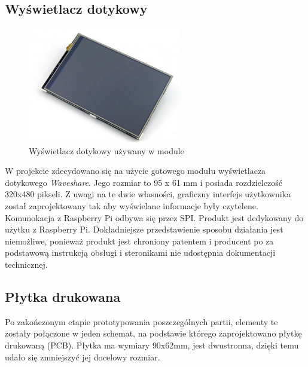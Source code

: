 \documentclass[12pt, eng, twoside, openany, final]{mgr}
\begin{document}
        \subsection{Wyświetlacz dotykowy}
            \begin{figure}[H]
            \begin{center}
                \includegraphics[width=0.6\textwidth]{wyswietlacz.jpg}
                \caption{Wyświetlacz dotykowy używany w module} 
            \end{center}
            \end{figure}
            W projekcie zdecydowano się na użycie gotowego modułu wyświetlacza dotykowego 
            \emph{Waveshare}. Jego rozmiar to 95 x 61 mm i posiada rozdzielczość 320x480 pikseli. Z uwagi na te dwie własności, graficzny interfejs użytkownika został zaprojektowany tak aby wyświelane informacje były czytelene. Komunokacja z Raspberry Pi odbywa się przez SPI. Produkt jest dedykowany do użytku z Raspberry Pi. Dokładniejsze przedstawienie sposobu działania jest niemożliwe, ponieważ produkt jest chroniony patentem i producent po za podstawową instrukcją obsługi i steronikami nie udostępnia dokumentacji technicznej.

        
        \subsection{Płytka drukowana}
            Po zakończonym etapie prototypowania poszczególnych partii, elementy te zostały połączone w jeden schemat, na podstawie którego zaprojektowano płytkę drukowaną (PCB). 
            Płytka ma wymiary 90x62mm, jest dwustronna, dzięki temu udało się zmniejszyć jej docelowy rozmiar.
            
\end{document}
